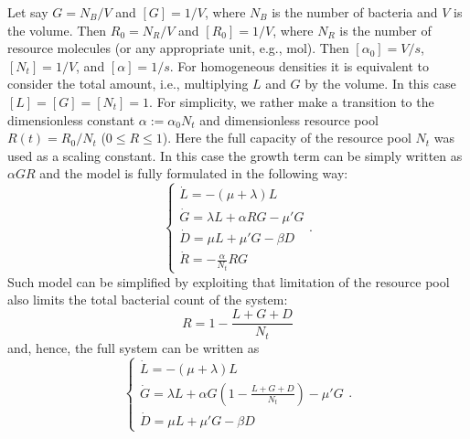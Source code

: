 \documentclass[10pt,A4paper]{article}
\numberwithin{equation}{section}
\begin{document}
Let say $G=N_B/V$ and $[G]=1/V$, where $N_B$ is the number of bacteria and $V$ is the volume.
Then $R_0=N_R/V$ and $[R_0]=1/V$, where $N_R$ is the number of resource molecules (or any appropriate unit, e.g., mol).
Then $[\alpha_0]=V/s$, $[N_t]=1/V$, and $[\alpha]=1/s$.
For homogeneous densities it is equivalent to consider the total amount, i.e., multiplying $L$ and $G$ by the volume.
In this case $[L]=[G]=[N_t]=1$.
For simplicity, we rather make a transition to the dimensionless constant $\alpha:=\alpha_0 N_t$ and dimensionless resource pool $R(t) = R_0 / N_t$ ($0 \leqslant R \leqslant 1$).
Here the full capacity of the resource pool $N_t$ was used as a scaling constant.
In this case the growth term can be simply written as $\alpha G R$ and the model is fully formulated in the following way:
\begin{equation}
    \begin{cases}
        \dot{L} = -(\mu + \lambda) L\\
        \dot{G} = \lambda L + \alpha R G-\mu' G\\
        \dot{D} = \mu  L + \mu' G- \beta D\\
        \dot{R} = - \frac{\alpha}{N_t} R G
    \end{cases}.
\label{eq:ode_3pool_resource} 
\end{equation}
%
Such model can be simplified by exploiting that limitation of the resource pool also limits the total bacterial count of the system:
\begin{equation}
    R = 1 - \frac{L+G+D}{N_t}
\label{eq:resource}
\end{equation}
and, hence, the full system can be written as
\begin{equation}
    \begin{cases}
        \dot{L} = -(\mu + \lambda) L\\
        \dot{G} = \lambda L + \alpha G\left(1-\frac{L+G+D}{N_t}\right)-\mu' G\\
        \dot{D} = \mu  L + \mu' G- \beta D 
    \end{cases}.
\label{eq:ode_3pool_resource2} 
\end{equation}
\end{document}
